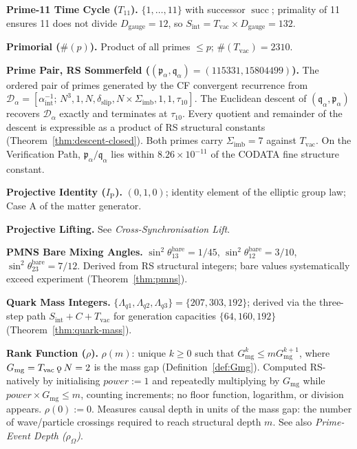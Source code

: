 \documentclass[11pt, letterpaper]{article}
\newcommand{\IP}{I_{\mathrm{P}}}
\renewcommand{\succ}{\operatorname{succ}}
\newcommand{\rank}{\rho}
\newcommand{\koppa}{\mathbin{\text{\rm\k{o}}}}
\newcommand{\Tcyc}{T_{11}}
\newcommand{\Dg}{D_{\mathrm{gauge}}}
\newcommand{\Sint}{S_{\mathrm{int}}}
\newcommand{\Sigimb}{\Sigma_{\mathrm{imb}}}
\newcommand{\dslip}{\delta_{\mathrm{slip}}}
\newcommand{\Tvac}{T_{\mathrm{vac}}}
\newcommand{\tauX}{\tau_{10}}
\newcommand{\aSC}{\alpha^{-1}_{\mathrm{int}}}
\newcommand{\pa}{\mathfrak{p}_\alpha}
\newcommand{\qa}{\mathfrak{q}_\alpha}
\newcommand{\Da}{\mathcal{D}_\alpha}
\theoremstyle{definition}
\theoremstyle{plain}
\begin{document}
\medskip\noindent\textbf{Prime-11 Time Cycle ($\Tcyc$).}
$\{1,\dots,11\}$ with successor $\succ$; primality of 11 ensures
11 does not divide $\Dg=12$, so $\Sint=T_{\mathrm{vac}}\times\Dg=132$.

\medskip\noindent\textbf{Primorial ($\#(p)$).}
Product of all primes $\leq p$; $\#(T_{\mathrm{vac}})=2310$.

\medskip\noindent\textbf{Prime Pair, RS Sommerfeld ($(\pa,\qa)=(115331,15804499)$).}
The ordered pair of primes generated by the CF convergent recurrence from
$\Da=[\aSC;\,N^3,1,N,\dslip,N\times\Sigimb,1,1,\tauX]$.  The Euclidean
descent of $(\qa,\pa)$ recovers $\Da$ exactly and terminates at $\tauX$.
Every quotient and remainder of the descent is expressible as a product of
RS structural constants (Theorem~\ref{thm:descent-closed}).  Both primes
carry $\Sigimb=7$ against $\Tvac$.  On the Verification Path,
$\pa/\qa$ lies within $8.26\times10^{-11}$ of the CODATA fine structure
constant.

\medskip\noindent\textbf{Projective Identity ($\IP$).}
$(0,1,0)$; identity element of the elliptic group law; Case A of the matter
generator.

\medskip\noindent\textbf{Projective Lifting.}
See \textit{Cross-Synchronisation Lift}.

\medskip\noindent\textbf{PMNS Bare Mixing Angles.}
$\sin^2\theta_{13}^{\mathrm{bare}}=1/45$,
$\sin^2\theta_{12}^{\mathrm{bare}}=3/10$,
$\sin^2\theta_{23}^{\mathrm{bare}}=7/12$.
Derived from RS structural integers; bare values systematically exceed
experiment (Theorem~\ref{thm:pmns}).

\medskip\noindent\textbf{Quark Mass Integers.}
$\{\Lambda_{q1},\Lambda_{q2},\Lambda_{q3}\}=\{207,303,192\}$; derived via the
three-step path $\Sint+C+T_{\mathrm{vac}}$ for generation capacities
$\{64,160,192\}$ (Theorem~\ref{thm:quark-mass}).

\medskip\noindent\textbf{Rank Function ($\rho$).}
$\rank(m)$: unique $k\geq 0$ such that $G_{\mathrm{mg}}^k\leq m 
G_{\mathrm{mg}}^{k+1}$, where $G_{\mathrm{mg}} = T_{\mathrm{vac}}\koppa N = 2$
is the mass gap (Definition~\ref{def:Gmg}).  Computed RS-natively by
initialising $\mathit{power}:=1$ and repeatedly multiplying by
$G_{\mathrm{mg}}$ while $\mathit{power}\times G_{\mathrm{mg}}\leq m$,
counting increments; no floor function, logarithm, or division appears.
$\rank(0):=0$.  Measures causal depth in units of the mass gap: the number
of wave/particle crossings required to reach structural depth $m$.
See also \textit{Prime-Event Depth ($\rho_\Omega$)}.
\end{document}
